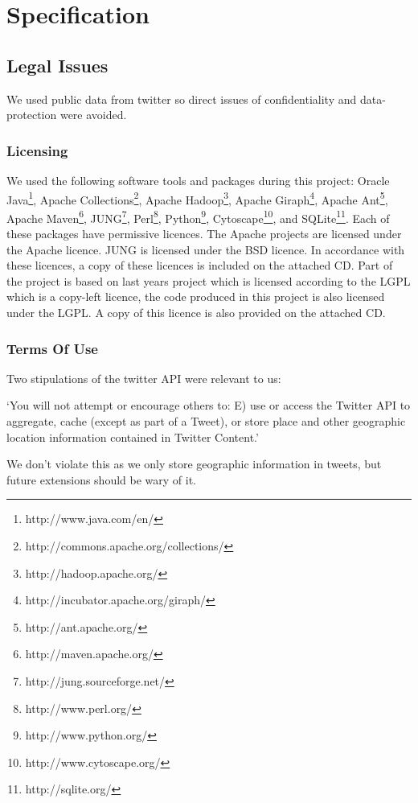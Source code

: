 \chapter{Specification}

\section{Legal Issues}

We used public data from twitter so direct issues of confidentiality and data-protection were avoided.

\subsection{Licensing}

We used the following software tools and packages during this project: Oracle Java\footnote{http://www.java.com/en/}, Apache Collections\footnote{http://commons.apache.org/collections/}, Apache Hadoop\footnote{http://hadoop.apache.org/}, Apache Giraph\footnote{http://incubator.apache.org/giraph/}, Apache Ant\footnote{http://ant.apache.org/}, Apache Maven\footnote{http://maven.apache.org/}, JUNG\footnote{http://jung.sourceforge.net/}, Perl\footnote{http://www.perl.org/}, Python\footnote{http://www.python.org/}, Cytoscape\footnote{http://www.cytoscape.org/}, and SQLite\footnote{http://sqlite.org/}. Each of these packages have permissive licences. The Apache projects are licensed under the Apache licence. JUNG is licensed under the BSD licence. In accordance with these licences, a copy of these licences is included on the attached CD. Part of the project is based on last years project which is licensed according to the LGPL which is a copy-left licence, the code produced in this project is also licensed under the LGPL. A copy of this licence is also provided on the attached CD.

\subsection{Terms Of Use}

Two stipulations of the twitter API were relevant to us:

`You will not attempt or encourage others to: E) use or access the Twitter API to aggregate, 
cache (except as part of a Tweet), or store place and other geographic location information 
contained in Twitter Content.'

We don't violate this as we only store geographic information in tweets, but future extensions should be wary of it.

